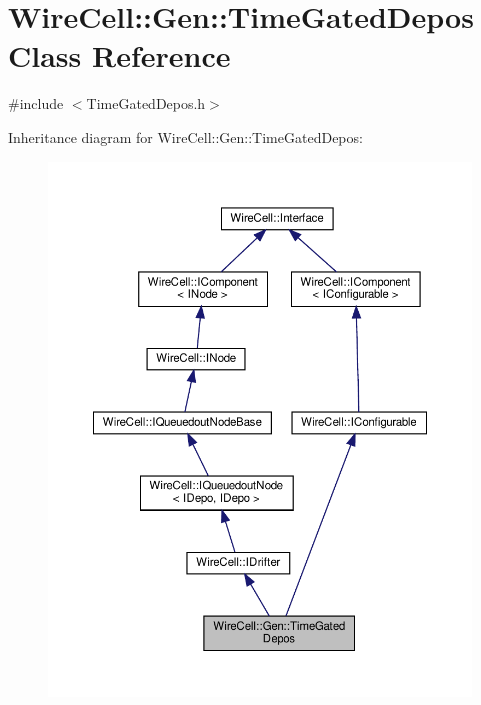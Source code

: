\hypertarget{class_wire_cell_1_1_gen_1_1_time_gated_depos}{}\section{Wire\+Cell\+:\+:Gen\+:\+:Time\+Gated\+Depos Class Reference}
\label{class_wire_cell_1_1_gen_1_1_time_gated_depos}


{\ttfamily \#include $<$Time\+Gated\+Depos.\+h$>$}



Inheritance diagram for Wire\+Cell\+:\+:Gen\+:\+:Time\+Gated\+Depos\+:
\nopagebreak
\begin{figure}[H]
\begin{center}
\leavevmode
\includegraphics[width=350pt]{class_wire_cell_1_1_gen_1_1_time_gated_depos__inherit__graph}
\end{center}
\end{figure}


